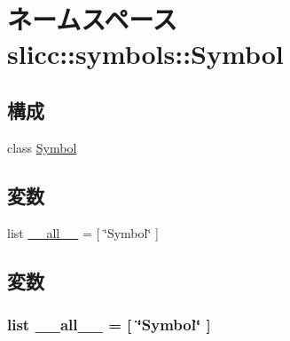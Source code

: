 \hypertarget{namespaceslicc_1_1symbols_1_1Symbol}{
\section{ネームスペース slicc::symbols::Symbol}
\label{namespaceslicc_1_1symbols_1_1Symbol}
}
\subsection*{構成}
\begin{DoxyCompactItemize}
\item 
class \hyperlink{classslicc_1_1symbols_1_1Symbol_1_1Symbol}{Symbol}
\end{DoxyCompactItemize}
\subsection*{変数}
\begin{DoxyCompactItemize}
\item 
list \hyperlink{namespaceslicc_1_1symbols_1_1Symbol_aa4a022e6ddacd362b83964da5cc5d044}{\_\-\_\-all\_\-\_\-} = \mbox{[} \char`\"{}Symbol\char`\"{} \mbox{]}
\end{DoxyCompactItemize}


\subsection{変数}
\hypertarget{namespaceslicc_1_1symbols_1_1Symbol_aa4a022e6ddacd362b83964da5cc5d044}{
\subsubsection[{\_\-\_\-all\_\-\_\-}]{\setlength{\rightskip}{0pt plus 5cm}list {\bf \_\-\_\-all\_\-\_\-} = \mbox{[} \char`\"{}Symbol\char`\"{} \mbox{]}}}
\label{namespaceslicc_1_1symbols_1_1Symbol_aa4a022e6ddacd362b83964da5cc5d044}
